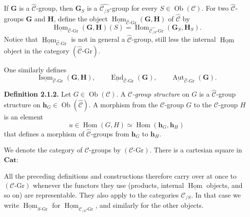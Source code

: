 If \(\mathbf G\) is a \(\widehat{\mathscr C}\)-group, then
\(\mathbf G_S\) is a \(\widehat{\mathscr C_{/S}}\)-group for every
\(S\in\operatorname{Ob}(\mathscr C)\). For two
\(\widehat{\mathscr C}\)-groups \(\mathbf G\) and \(\mathbf H\), define
the object
\(\underline{\operatorname{Hom}}_{
  \widehat{\mathscr C}\text{-}\mathrm{Gr}}(\mathbf G,\mathbf H)\)
of \(\widehat{\mathscr C}\) by
\[
  \underline{\operatorname{Hom}}_{
    \widehat{\mathscr C}\text{-}\mathrm{Gr}}(\mathbf G,\mathbf H)(S)
  =
  \operatorname{Hom}_{
    \widehat{\mathscr C_{/S}}\text{-}\mathrm{Gr}}
    (\mathbf G_S,\mathbf H_S).
\]
Notice that
\(\underline{\operatorname{Hom}}_{
  \widehat{\mathscr C}\text{-}\mathrm{Gr}}\)
is not in general a \(\widehat{\mathscr C}\)-group, still less the internal
\(\underline{\operatorname{Hom}}\) object in the category
\((\widehat{\mathscr C}\text{-}\mathrm{Gr})\).

One similarly defines
\[
  \underline{\operatorname{Isom}}_{
    \widehat{\mathscr C}\text{-}\mathrm{Gr}}(\mathbf G,\mathbf H),
  \qquad
  \underline{\operatorname{End}}_{
    \widehat{\mathscr C}\text{-}\mathrm{Gr}}(\mathbf G),
  \qquad
  \underline{\operatorname{Aut}}_{
    \widehat{\mathscr C}\text{-}\mathrm{Gr}}(\mathbf G).
\]

\medskip
\noindent{}\textbf{Definition 2.1.2.}
Let \(G\in\operatorname{Ob}(\mathscr C)\). A
\emph{\(\mathscr C\)-group structure} on \(G\) is a
\(\widehat{\mathscr C}\)-group structure on
\(\mathbf h_G\in\operatorname{Ob}(\widehat{\mathscr C})\). A morphism from
the \(\mathscr C\)-group \(G\) to the \(\mathscr C\)-group \(H\) is an
element
\[
  u\in\operatorname{Hom}(G,H)
  \simeq\operatorname{Hom}(\mathbf h_G,\mathbf h_H)
\]
that defines a morphism of \(\widehat{\mathscr C}\)-groups from
\(\mathbf h_G\) to \(\mathbf h_H\).

We denote the category of \(\mathscr C\)-groups by
\((\mathscr C\text{-}\mathrm{Gr})\). There is a cartesian square in
\(\mathbf{Cat}\):

\begin{center}
  
\end{center}

All the preceding definitions and constructions therefore carry over at
once to \((\mathscr C\text{-}\mathrm{Gr})\) whenever the functors they use
(products, internal \(\underline{\operatorname{Hom}}\) objects, and so on)
are representable. They also apply to the categories \(\mathscr C_{/S}\).
In that case we write
\(\underline{\operatorname{Hom}}_{S\text{-}\mathrm{Gr}}\) for
\(\underline{\operatorname{Hom}}_{\mathscr C_{/S}\text{-}\mathrm{Gr}}\),
and similarly for the other objects.

